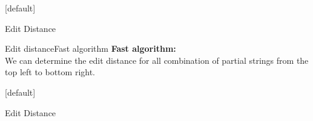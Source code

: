 
{%
  [default]
  \makeatletter\def\beamer@entrycode{\vspace*{-\headheight}}\makeatother
  \begin{frame}{Edit Distance}
    \begin{center}
      \begin{adjustbox}{width=0.8\linewidth}
        \def\AlgoIntro{1}\def\AlgoFinal{0}%
        
      \end{adjustbox}
    \end{center}
  \end{frame}
}%


\begin{frame}{Edit distance}{Fast algorithm}
  \textbf{Fast algorithm:}\\
  We can determine the {\color{Mittel-Blau}edit distance} for all combination
  of partial strings from the top left to bottom right.
\end{frame}


{%
  [default]
  \makeatletter\def\beamer@entrycode{\vspace*{-\headheight}}\makeatother
  \begin{frame}{Edit Distance}
    \begin{center}
      \begin{adjustbox}{width=0.8\linewidth}
        \def\AlgoIntro{0}\def\AlgoFinal{0}%
        
      \end{adjustbox}
    \end{center}
  \end{frame}
}%


